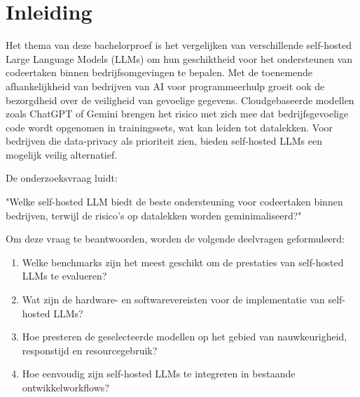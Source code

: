 


% 

\section{Inleiding}%
\label{sec:inleiding}

Het thema van deze bachelorproef is het vergelijken van verschillende self-hosted Large Language Models (LLMs) om hun geschiktheid voor het ondersteunen van codeertaken binnen bedrijfsomgevingen te bepalen. Met de toenemende afhankelijkheid van bedrijven van AI voor programmeerhulp groeit ook de bezorgdheid over de veiligheid van gevoelige gegevens. Cloudgebaseerde modellen zoals ChatGPT of Gemini brengen het risico met zich mee dat bedrijfsgevoelige code wordt opgenomen in trainingssets, wat kan leiden tot datalekken. Voor bedrijven die data-privacy als prioriteit zien, bieden self-hosted LLMs een mogelijk veilig alternatief.

De onderzoeksvraag luidt:

"Welke self-hosted LLM biedt de beste ondersteuning voor codeertaken binnen bedrijven, terwijl de risico’s op datalekken worden geminimaliseerd?"

Om deze vraag te beantwoorden, worden de volgende deelvragen geformuleerd:

\begin{enumerate}
    \item Welke benchmarks zijn het meest geschikt om de prestaties van self-hosted LLMs te evalueren?

    \item Wat zijn de hardware- en softwarevereisten voor de implementatie van self-hosted LLMs?

    \item Hoe presteren de geselecteerde modellen op het gebied van nauwkeurigheid, responstijd en resourcegebruik?

    \item Hoe eenvoudig zijn self-hosted LLMs te integreren in bestaande ontwikkelworkflows?

\end{enumerate}

